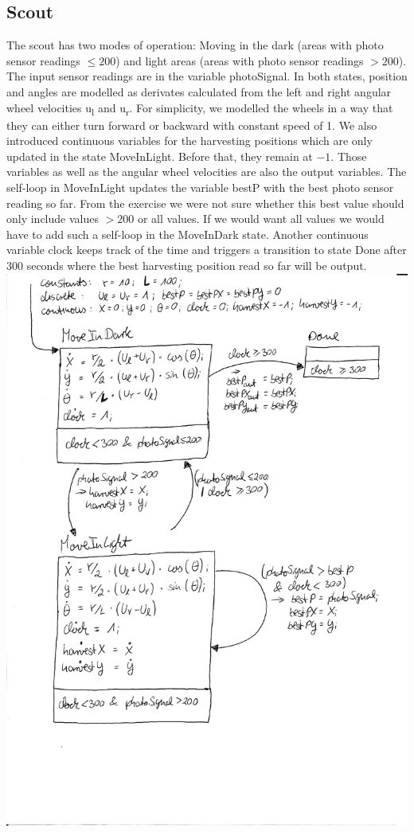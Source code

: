 \documentclass[12pt]{article}
\begin{document}
\subsection* {Scout}
The scout has two modes of operation: Moving in the dark (areas with photo sensor readings $\leq 200$) and light areas (areas with photo sensor readings $> 200$). The input sensor readings are in the variable photoSignal. In both states, position and angles are modelled as derivates calculated from the left and right angular wheel velocities u\textsubscript{l} and u\textsubscript{r}. For simplicity, we modelled the wheels in a way that they can either turn forward or backward with constant speed of 1. We also introduced continuous variables for the harvesting positions which are only updated in the state MoveInLight. Before that, they remain at $-1$. Those variables as well as the angular wheel velocities are also the output variables. The self-loop in MoveInLight updates the variable bestP with the best photo sensor reading so far. From the exercise we were not sure whether this best value should only include values $> 200$ or all values. If we would want all values we would have to add such a self-loop in the MoveInDark state. Another continuous variable clock keeps track of the time and triggers a transition to state Done after 300 seconds where the best harvesting position read so far will be output.\\
\includegraphics[scale = 0.8]{pictures/hybrid_automata_scout}
\end{document}
